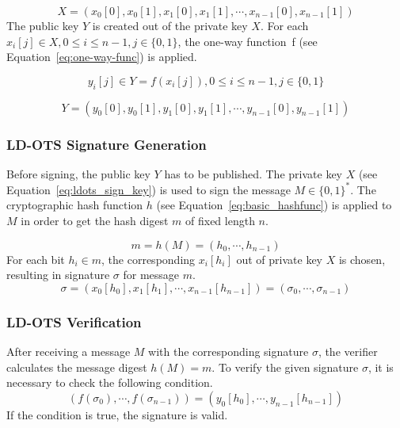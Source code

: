 \begin{equation}
\label{eq:ldots_sign_key}
X = \left(x_{0}\left[0\right], x_{0}\left[1\right], x_{1}\left[0\right], x_{1}\left[1\right], \cdots, x_{n-1}\left[0\right], x_{n-1}\left[1\right] \right)
\end{equation}
The public key $Y$ is created out of the private key $X$. For each $x_i[j] \in X, 0 \leq i \leq n-1, j \in \lbrace 0,1 \rbrace$, the one-way function~f (see Equation~\ref{eq:one-way-func}) is applied.

\begin{equation}
y_i[j] \in Y = f(x_i[j]), 0 \leq i \leq n-1, j \in \lbrace 0,1 \rbrace
\end{equation}

\begin{equation}
Y = \left( 
y_{0}\left[0\right], y_{0}\left[1 \right], y_{1}\left[0\right], y_{1}\left[1\right], \cdots, y_{n-1}\left[0\right], y_{n-1}\left[1\right]
\right)
\end{equation}

\subsubsection{LD-OTS Signature Generation} %
Before signing, the public key $Y$ has to be published.
The private key $X$ (see Equation~\ref{eq:ldots_sign_key}) is used to sign the message $M \in \lbrace 0,1 \rbrace^*$. 
The cryptographic hash function $h$ (see Equation~\ref{eq:basic_hashfunc}) is applied to $M$ in order to get the hash digest $m$ of fixed length $n$.

\begin{equation}
\label{eq:hash_message}
m = h(M) = (h_{0}, \cdots, h_{n-1})
\end{equation} %
For each bit $h_i \in m$, the corresponding $x_i[h_i]$ out of private key $X$ is chosen, resulting in signature $\sigma$ for message $m$.
\begin{equation}
\sigma = \left(
x_0 \left[ h_0 \right], x_1\left[ h_1 \right], \cdots, x_{n-1}\left[ h_{n-1}\right]
\right) = (\sigma_0, \cdots, \sigma_{n-1})
\end{equation}

\subsubsection{LD-OTS Verification}
After receiving a message $M$ with the corresponding signature $\sigma$, the verifier calculates the message digest $h(M) = m$. 
To verify the given signature $\sigma$, it is necessary to check the following condition.
\begin{equation}
\left(
f(\sigma_0), \cdots, f(\sigma_{n-1})
\right) =
\left(
y_0[h_0], \cdots, y_{n-1}[h_{n-1}]
\right)
\end{equation}
If the condition is true, the signature is valid.

